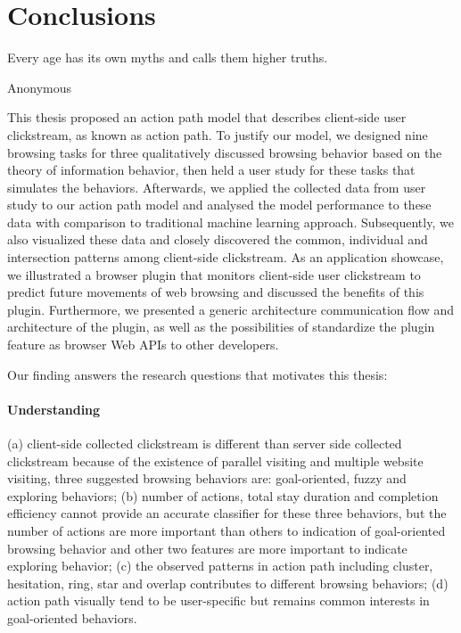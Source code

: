 \section{Conclusions}
\label{ch:final}

\epigraph{Every age has its own myths and calls them higher truths.}{Anonymous}



This thesis proposed an action path model that describes client-side user clickstream,
as known as action path.
To justify our model, we designed nine browsing tasks for three qualitatively
discussed browsing behavior based on the theory of information behavior, then 
held a user study for these tasks that simulates the behaviors. 
Afterwards, we applied the collected data from user study to our action path model and
analysed the model performance to these data with comparison to traditional machine 
learning approach.
Subsequently, we also visualized these data and closely discovered the common, 
individual and intersection patterns among client-side clickstream.
As an application showcase, we illustrated a browser plugin that monitors client-side 
user clickstream to predict future movements of web browsing and discussed the benefits of this plugin.
Furthermore, we presented a generic architecture communication flow and architecture of the plugin, 
as well as the possibilities of standardize the plugin feature as browser Web APIs to other developers.


Our finding answers the research questions that motivates this thesis:

\paragraph{Understanding} (a) client-side collected clickstream is different than 
server side collected clickstream because of the existence of parallel visiting 
and multiple website visiting, three suggested browsing behaviors are: 
goal-oriented, fuzzy and exploring behaviors;
(b) number of actions, total stay duration and completion efficiency cannot 
provide an accurate classifier for these three behaviors, 
but the number of actions are more important than others to indication of 
goal-oriented browsing behavior and other two features are more important 
to indicate exploring behavior;
(c) the observed patterns in action path including cluster, hesitation, ring, 
star and overlap contributes to different browsing behaviors;
(d) action path visually tend to be user-specific but remains common interests 
in goal-oriented behaviors.
